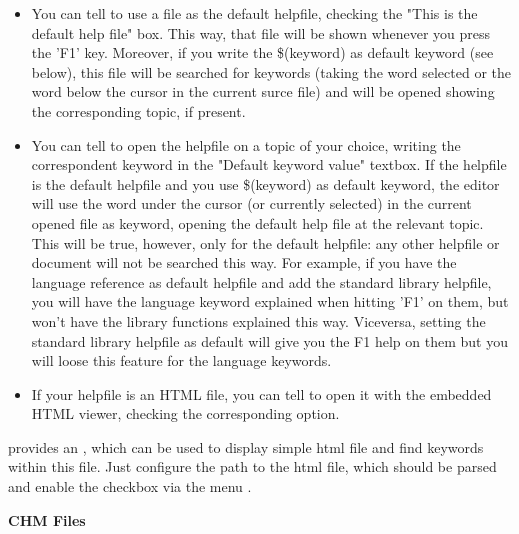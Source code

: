 \begin{itemize}
\item You can tell \codeblocks to use a file as the default helpfile, checking the "This is the default help file" box. This way, that file will be shown whenever you press the 'F1' key. Moreover, if you write the \$(keyword) as default keyword (see below), this file will be searched for keywords (taking the word selected or the word below the cursor in the current surce file) and will be opened showing the corresponding topic, if present.

\item You can tell \codeblocks to open the helpfile on a topic of your choice, writing the correspondent keyword in the "Default keyword value" textbox. If the helpfile is the default helpfile and you use \$(keyword) as default keyword, the editor will use the word under the cursor (or currently selected) in the current opened file as keyword, opening the default help file at the relevant topic. This will be true, however, only for the default helpfile: any other helpfile or document will not be searched this way. For example, if you have the language reference as default helpfile and add the standard library helpfile, you will have the language keyword explained when hitting 'F1' on them, but won't have the library functions explained this way. Viceversa, setting the standard library helpfile as default will give you the F1 help on them but you will loose this feature for the language keywords.

\item If your helpfile is an HTML file, you can tell \codeblocks to open it with the embedded HTML viewer, checking the corresponding option.
\end{itemize}

\codeblocks provides an , which can be used to display simple html file and find keywords within this file. Just configure the path to the html file, which should be parsed and enable the checkbox  via the menu .



\textbf{CHM Files}


